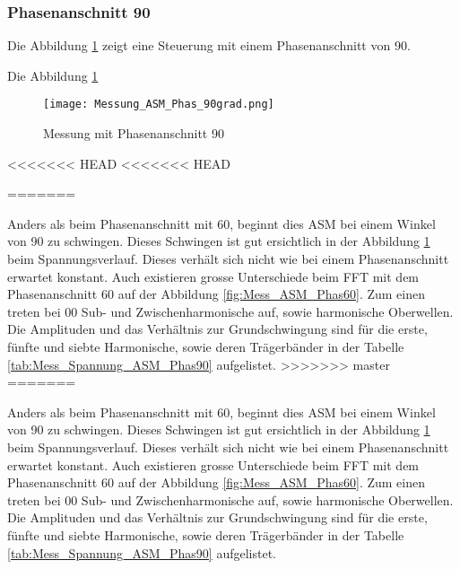 \newpage
\subsubsection*{Phasenanschnitt 90\textdegree}
Die Abbildung \ref{fig:Mess_ASM_Phas90} zeigt eine Steuerung mit einem Phasenanschnitt von 90\textdegree.

Die Abbildung \ref{fig:Mess_ASM_Phas90}
\begin{figure}[ht!]
	\centering
	\texttt{[image: Messung\_ASM\_Phas\_90grad.png]}	
	\caption{Messung mit Phasenanschnitt 90\textdegree}\label{fig:Mess_ASM_Phas90}
\end{figure}
<<<<<<< HEAD
<<<<<<< HEAD
 

=======

Anders als beim Phasenanschnitt mit 60\textdegree, beginnt dies ASM bei einem Winkel von 90\textdegree \hspace{0.02cm} zu schwingen. Dieses Schwingen ist gut ersichtlich in der Abbildung \ref{fig:Mess_ASM_Phas90} beim Spannungsverlauf. Dieses verhält sich nicht wie bei einem Phasenanschnitt erwartet konstant. Auch existieren grosse Unterschiede beim FFT mit dem Phasenanschnitt 60\textdegree \hspace{0.02cm} auf der Abbildung \ref{fig:Mess_ASM_Phas60}. Zum einen treten bei 00\textdegree \hspace{0.02cm} Sub- und Zwischenharmonische auf, sowie harmonische Oberwellen. Die Amplituden und das Verhältnis zur Grundschwingung sind für die erste, fünfte und siebte Harmonische, sowie deren Trägerbänder in der Tabelle \ref{tab:Mess_Spannung_ASM_Phas90} aufgelistet. 
\newpage
>>>>>>> master
=======

Anders als beim Phasenanschnitt mit 60\textdegree, beginnt dies ASM bei einem Winkel von 90\textdegree \hspace{0.02cm} zu schwingen. Dieses Schwingen ist gut ersichtlich in der Abbildung \ref{fig:Mess_ASM_Phas90} beim Spannungsverlauf. Dieses verhält sich nicht wie bei einem Phasenanschnitt erwartet konstant. Auch existieren grosse Unterschiede beim FFT mit dem Phasenanschnitt 60\textdegree \hspace{0.02cm} auf der Abbildung \ref{fig:Mess_ASM_Phas60}. Zum einen treten bei 00\textdegree \hspace{0.02cm} Sub- und Zwischenharmonische auf, sowie harmonische Oberwellen. Die Amplituden und das Verhältnis zur Grundschwingung sind für die erste, fünfte und siebte Harmonische, sowie deren Trägerbänder in der Tabelle \ref{tab:Mess_Spannung_ASM_Phas90} aufgelistet. 
\newpage

